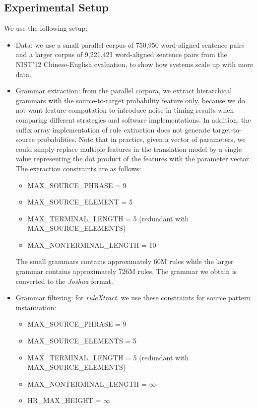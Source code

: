 \subsection{Experimental Setup}
We use the following setup:
\begin{itemize}
  \item Data: we use a small parallel corpus of 750,950 word-aligned sentence
    pairs and a larger corpus of 9,221,421 word-aligned sentence pairs from the
    NIST'12 Chinese-English evaluation, to show how systems scale up with more
    data.
  \item Grammar extraction: from the parallel corpora, we extract hierarchical
    grammars with the source-to-target probability feature only, because we do
    not want feature computation to introduce noise in timing results when
    comparing different strategies and software implementations. In addition,
    the suffix array implementation of rule extraction does not generate
    target-to-source probabilities. Note that in practice, given a vector of
    parameters, we could simply replace multiple features in the translation
    model by a single value representing the dot product of the features with
    the parameter vector. The extraction constraints are as follows:
%
\begin{itemize}
  \item MAX\_SOURCE\_PHRASE = 9
  \item MAX\_SOURCE\_ELEMENT = 5
  \item MAX\_TERMINAL\_LENGTH = 5 (redundant with MAX\_SOURCE\_ELEMENTS)
  \item MAX\_NONTERMINAL\_LENGTH = 10
\end{itemize}
%
The small grammars contains approximately 60M rules while the 
larger grammar contains approximately 726M rules. The grammar we obtain is
converted to the \emph{Joshua} format.
  \item Grammar filtering: for \emph{ruleXtract}, we use these constraints for
    source pattern instantiation: 
    \begin{itemize}
      \item MAX\_SOURCE\_PHRASE = 9
      \item MAX\_SOURCE\_ELEMENTS = 5
      \item MAX\_TERMINAL\_LENGTH = 5 (redundant with MAX\_SOURCE\_ELEMENTS)
      \item MAX\_NONTERMINAL\_LENGTH = $\infty$
      \item HR\_MAX\_HEIGHT = $\infty$
    \end{itemize}

\end{itemize}
